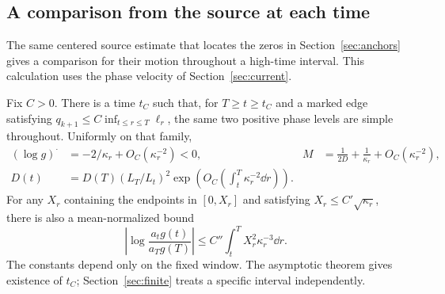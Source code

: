 \subsection{A comparison from the source at each time}\label{sec:transport}
The same centered source estimate that locates the zeros in Section~\ref{sec:anchors} gives a comparison for their motion throughout a high-time interval. This calculation uses the phase velocity of Section~\ref{sec:current}.

\begin{theorem}\label{thm:transfer}
Fix \(C>0\). There is a time \(t_C\) such that, for \(T\ge t\ge t_C\) and a marked edge satisfying \(q_{k+1}\le C\inf_{t\le r\le T}\ell_r\), the same two positive phase levels are simple throughout. Uniformly on that family,
\begin{align}
 (\log g)^{\displaystyle\cdot}&=-2/\kappa_r+O_C(\kappa_r^{-2})<0,
 &M&=\frac1{2D}+\frac1{\kappa_r}+O_C(\kappa_r^{-2}),\label{eq:asymM}\\
 D(t)&=D(T)(L_T/L_t)^2
           \exp\!\left(O_C\!\left(\int_t^T\kappa_r^{-2}\dd r\right)\right).
 \label{eq:asymD}
\end{align}
For any \(X_r\) containing the endpoints in \([0,X_r]\) and satisfying \(X_r\le C'\sqrt{\kappa_r}\), there is also a mean-normalized bound
\begin{equation}
 \left|\log\frac{a_t g(t)}{a_Tg(T)}\right|
 \le C''\int_t^T X_r^2\kappa_r^{-3}\dd r. \label{eq:meanD}
\end{equation}
The constants depend only on the fixed window. The asymptotic theorem gives existence of \(t_C\); Section~\ref{sec:finite} treats a specific interval independently.
\end{theorem}
